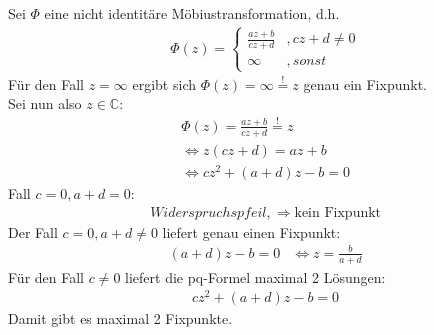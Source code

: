 \section{}
\subsection{}
    Sei $\Phi$ eine nicht identitäre Möbiustransformation, d.h.
    \begin{align}
		&\Phi (z)= 
		\begin{cases}
            \frac{az+b}{cz+d} &,cz+d \neq 0\\
            \infty & ,sonst
        \end{cases}
	\end{align}
	Für den Fall $z=\infty$ ergibt sich $\Phi(z)=\infty \overset{!}{=}z$ genau ein Fixpunkt.\\
	Sei nun also $z \in \mathbb{C}$:
	\begin{align}
		&\Phi(z)=\frac{az+b}{cz+d}\overset{!}{=}z\\
		&\Leftrightarrow z(cz+d)=az+b\\
		&\Leftrightarrow cz^2+(a+d)z-b=0
	\end{align}
	Fall $c=0, a+d=0$:
    \begin{align}
		& Widerspruchspfeil, \Rightarrow \text{kein Fixpunkt}
	\end{align}
    Der Fall $c=0, a+d \neq 0$ liefert genau einen Fixpunkt:
    \begin{align}
		& (a+d)z-b=0
        & \Leftrightarrow z= \frac{b}{a+d}
	\end{align}
	Für den Fall $c \neq 0$ liefert die pq-Formel maximal 2 Lösungen:
    \begin{align}
		& cz^2+(a+d)z-b=0
	\end{align}
	Damit gibt es maximal 2 Fixpunkte.
\subsection{}